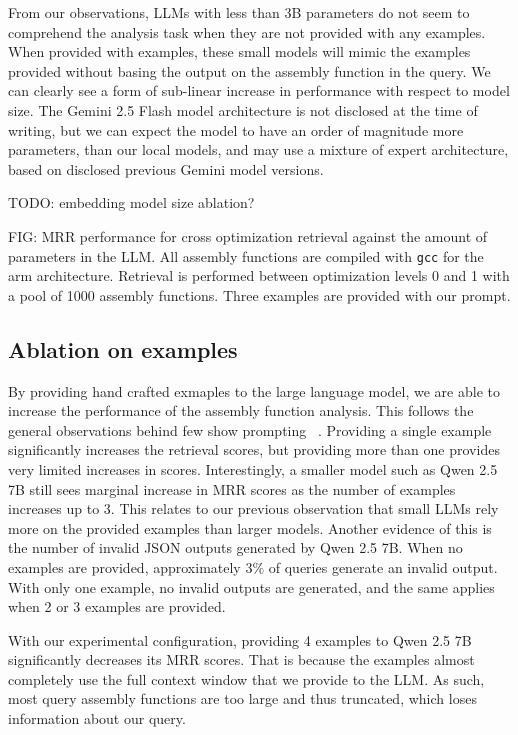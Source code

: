 \documentclass[conference,compsoc]{IEEEtran}
\begin{document}
From our observations, LLMs with less than 3B parameters do not seem to comprehend the analysis task when
they are not provided with any examples. When provided with examples, these small models will mimic the examples provided without basing the
output on the assembly function in the query. We can clearly see a form of sub-linear increase in performance with respect to model size.
The Gemini 2.5 Flash model architecture is not disclosed at the time of writing, but we can expect the model to have an order
of magnitude more parameters, than our local models, and may use a mixture of expert architecture, based on disclosed previous Gemini model versions.

TODO: embedding model size ablation?

FIG: MRR performance for cross optimization retrieval against the amount of parameters in the LLM. All assembly functions are compiled
with \texttt{gcc} for the arm architecture. Retrieval is performed between optimization levels 0 and 1 with a pool of 1000 assembly functions.
Three examples are provided with our prompt.

\subsection{Ablation on examples}

By providing hand crafted exmaples to the large language model, we are able to increase the performance of the assembly function analysis.
This follows the general observations behind few show prompting ~\cite{few-shot}. Providing a single example significantly increases the retrieval
scores, but providing more than one provides very limited increases in scores. Interestingly, a smaller model
such as Qwen 2.5 7B still sees marginal increase in MRR scores as the number of examples increases up to 3. This relates to our previous observation
that small LLMs rely more on the provided examples than larger models. Another evidence of this is the number of invalid JSON outputs generated by
Qwen 2.5 7B. When no examples are provided, approximately \(3\%\) of queries generate an invalid output. With only one example, no invalid
outputs are generated, and the same applies when 2 or 3 examples are provided.

With our experimental configuration, providing 4 examples to Qwen 2.5 7B significantly decreases its MRR scores. That is because
the examples almost completely use the full context window that we provide to the LLM. As such, most query assembly functions are
too large and thus truncated, which loses information about our query.
\end{document}

